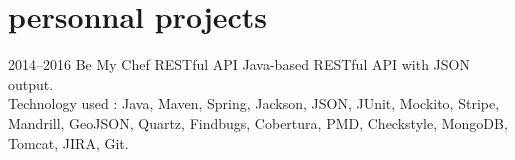 \documentclass[]{friggeri-cv} %
\begin{document}







\section{personnal projects}

\begin{entrylist}

\entry
{2014--2016}
{Be My Chef}
{  RESTful API}
{}
{Java-based RESTful API with JSON output.\\
Technology used : Java, Maven, Spring, Jackson, JSON, JUnit, Mockito, Stripe, Mandrill, GeoJSON, Quartz, Findbugs, Cobertura, PMD, Checkstyle, MongoDB, Tomcat, JIRA, Git.}

\end{entrylist}
\end{document}
